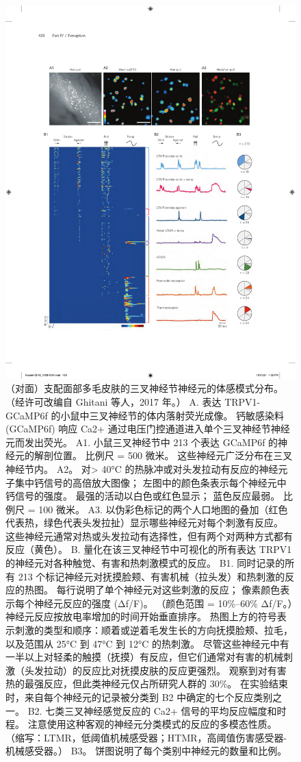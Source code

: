 \begin{figure}[htbp]
	\centering
	\includegraphics[width=0.8\linewidth]{chap18/fig_18_12}
	\caption{（对面）支配面部多毛皮肤的三叉神经节神经元的体感模式分布。 （经许可改编自 Ghitani 等人，2017 年。）
		A. 表达 TRPV1-GCaMP6f 的小鼠中三叉神经节的体内落射荧光成像。 
		钙敏感染料 (GCaMP6f) 响应 Ca2+ 通过电压门控通道进入单个三叉神经节神经元而发出荧光。 
		A1. 小鼠三叉神经节中 213 个表达 GCaMP6f 的神经元的解剖位置。 比例尺 = 500 微米。 这些神经元广泛分布在三叉神经节内。 
		A2。 对> 40°C 的热脉冲或对头发拉动有反应的神经元子集中钙信号的高倍放大图像； 左图中的颜色条表示每个神经元中钙信号的强度。 最强的活动以白色或红色显示； 蓝色反应最弱。 比例尺 = 100 微米。 
		A3. 以伪彩色标记的两个人口地图的叠加（红色代表热，绿色代表头发拉扯）显示哪些神经元对每个刺激有反应。 这些神经元通常对热或头发拉动有选择性，但有两个对两种方式都有反应（黄色）。 
		B. 量化在该三叉神经节中可视化的所有表达 TRPV1 的神经元对各种触觉、有害和热刺激模式的反应。 
		B1. 同时记录的所有 213 个标记神经元对抚摸脸颊、有害机械（拉头发）和热刺激的反应的热图。 每行说明了单个神经元对这些刺激的反应； 像素颜色表示每个神经元反应的强度 (Δf/F)。 （颜色范围 = 10\%–60\% Δf/F。）神经元反应按放电率增加的时间开始垂直排序。 热图上方的符号表示刺激的类型和顺序：顺着或逆着毛发生长的方向抚摸脸颊、拉毛，以及范围从 25°C 到 47°C 到 12°C 的热刺激。 
		尽管这些神经元中有一半以上对轻柔的触摸（抚摸）有反应，但它们通常对有害的机械刺激（头发拉动）的反应比对抚摸皮肤的反应更强烈。 
		观察到对有害热的最强反应，但此类神经元仅占所研究人群的 30\%。 在实验结束时，来自每个神经元的记录被分类到 B2 中确定的七个反应类别之一。 
		B2. 七类三叉神经感觉反应的 Ca2+ 信号的平均反应幅度和时程。 注意使用这种客观的神经元分类模式的反应的多模态性质。 （缩写：LTMR，低阈值机械感受器；HTMR，高阈值伤害感受器-机械感受器。） 
		B3。 饼图说明了每个类别中神经元的数量和比例。}
	\label{fig:18_12}
\end{figure}

